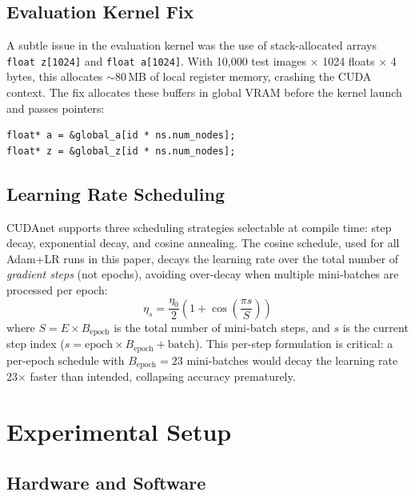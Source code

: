 \documentclass[conference]{IEEEtran}
\begin{document}
\subsection{Evaluation Kernel Fix}

A subtle issue in the evaluation kernel was the use of stack-allocated arrays \texttt{float\,z[1024]} and \texttt{float\,a[1024]}. With 10,000 test images $\times$ 1024 floats $\times$ 4 bytes, this allocates $\sim$80\,MB of local register memory, crashing the CUDA context. The fix allocates these buffers in global VRAM before the kernel launch and passes pointers:
\begin{verbatim}
float* a = &global_a[id * ns.num_nodes];
float* z = &global_z[id * ns.num_nodes];
\end{verbatim}

\subsection{Learning Rate Scheduling}

CUDAnet supports three scheduling strategies selectable at compile time: step decay, exponential decay, and cosine annealing. The cosine schedule, used for all Adam+LR runs in this paper, decays the learning rate over the total number of \emph{gradient steps} (not epochs), avoiding over-decay when multiple mini-batches are processed per epoch:
\begin{equation}
\eta_s = \frac{\eta_0}{2}\left(1 + \cos\!\left(\frac{\pi s}{S}\right)\right)
\end{equation}
where $S = E \times B_\text{epoch}$ is the total number of mini-batch steps, and $s$ is the current step index ($s = \text{epoch} \times B_\text{epoch} + \text{batch}$). This per-step formulation is critical: a per-epoch schedule with $B_\text{epoch}=23$ mini-batches would decay the learning rate 23$\times$ faster than intended, collapsing accuracy prematurely.

\section{Experimental Setup}

\subsection{Hardware and Software}
\end{document}

